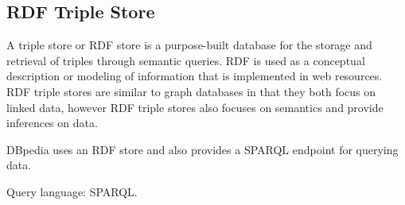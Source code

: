 \subsection{RDF Triple Store}
A triple store or RDF store is a purpose-built database for the storage and retrieval of triples through semantic queries. RDF is used as a conceptual description or modeling of information that is implemented in web resources. RDF triple stores are similar to graph databases in that they both focus on linked data, however RDF triple stores also focuses on semantics and provide inferences on data.

DBpedia uses an RDF store and also provides a SPARQL endpoint for querying data.

Query language: SPARQL.


